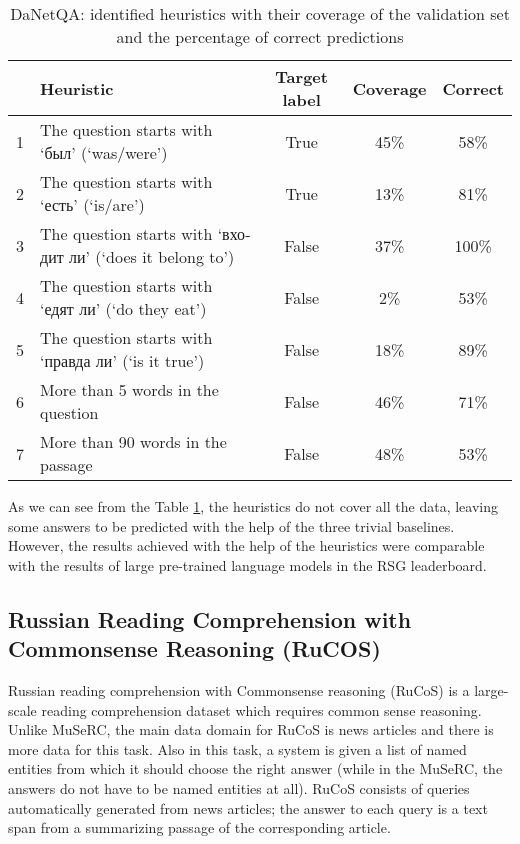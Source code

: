 \documentclass[11pt]{article}
\begin{document}
\begin{table}[t]
\centering
\begin{tabular}{|c|p{}|c|c|c|}
\hline
& \textbf{Heuristic} & \textbf{Target label} & \textbf{Coverage} & \textbf{Correct} \\
\hline
1 & The question starts with \foreignlanguage{russian}{`был'} (`was/were') & True & 45\% &  58\% \\
\hline
2 & The question starts with \foreignlanguage{russian}{`есть'} (`is/are') & True & 13\% &  81\% \\
\hline
3 & The question starts with \foreignlanguage{russian}{`входит ли'} (`does it belong to') & False & 37\% &  100\% \\
\hline
4 & The question starts with \foreignlanguage{russian}{`едят ли'} (`do they eat')  & False & 2\% &  53\% \\
\hline
5 & The question starts with \foreignlanguage{russian}{`правда ли'} (`is it true') & False & 18\% &  89\% \\
\hline
6 & More than 5 words in the question & False & 46\% &  71\% \\
\hline 
7 & More than 90 words in the passage & False & 48\% &  53\% \\
\hline
\end{tabular}
\caption{DaNetQA: identified heuristics with their coverage of the validation set and the percentage of correct predictions}
\label{table:DaNetQA_heuristics}
\end{table}

As we can see from the Table \ref{table:DaNetQA_heuristics}, the heuristics do not cover all the data, leaving some answers to be predicted with the help of the three trivial baselines. However, the results achieved with the help of the heuristics were comparable with the results of large pre-trained language models in the RSG leaderboard. 

\subsection{Russian Reading Comprehension with Commonsense Reasoning (RuCOS)}
Russian reading comprehension with Commonsense reasoning (RuCoS) is a large-scale reading comprehension dataset which requires common sense reasoning. Unlike MuSeRC, the main data domain for RuCoS is news articles and there is more data for this task. Also in this task, a system is given a list of named entities from which it should choose the right answer (while in the MuSeRC, the answers do not have to be named entities at all). RuCoS consists of queries automatically generated from news articles; the answer to each query is a text span from a summarizing passage of the corresponding article.
\end{document}
